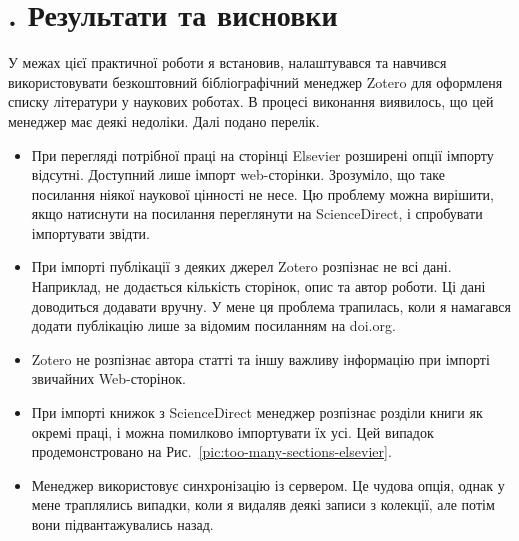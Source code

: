 \documentclass[oneside,14pt,a4paper]{extreport}
\newcommand\Section[1]{
 \refstepcounter{section}
 \section*{
  \arabic{section}. #1}
}
\begin{document}
\Section{Результати та висновки}

У межах цієї практичної роботи я встановив, налаштувався та навчився використовувати безкоштовний бібліографічний менеджер Zotero для оформленя списку літератури у наукових роботах. В процесі виконання виявилось, що цей менеджер має деякі недоліки. Далі подано перелік.

\begin{itemize}
    \item При перегляді потрібної праці на сторінці Elsevier розширені опції імпорту відсутні. Доступний лише імпорт web-сторінки. Зрозуміло, що таке посилання ніякої наукової цінності не несе. Цю проблему можна вирішити, якщо натиснути на посилання \flqq{}переглянути на ScienceDirect\frqq{}, і спробувати імпортувати звідти.
    \item При імпорті публікації з деяких джерел Zotero розпізнає не всі дані. Наприклад, не додається кількість сторінок, опис та автор роботи. Ці дані доводиться додавати вручну. У мене ця проблема трапилась, коли я намагався додати публікацію лише за відомим посиланням на doi.org.
    \item Zotero не розпізнає автора статті та іншу важливу інформацію при імпорті звичайних Web-сторінок.
    \item При імпорті книжок з ScienceDirect менеджер розпізнає розділи книги як окремі праці, і можна помилково імпортувати їх усі. Цей випадок продемонстровано на Рис.~\ref{pic:too-many-sections-elsevier}.
    \item Менеджер використовує синхронізацію із сервером. Це чудова опція, однак у мене траплялись випадки, коли я видаляв деякі записи з колекції, але потім вони підвантажувались назад.
\end{itemize}
\end{document}
